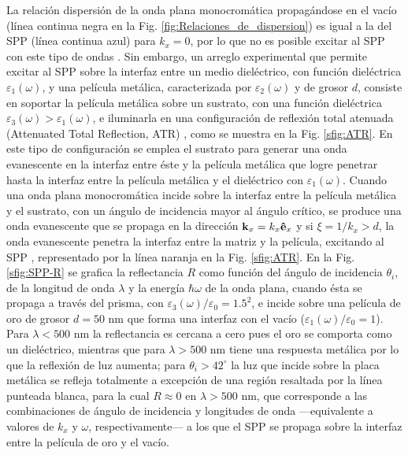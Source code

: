 La relación dispersión de la onda plana monocromática propagándose en el vacío (línea continua negra en la Fig. \ref{fig:Relaciones_de_dispersion})  es igual a la del SPP (línea continua azul) para  $k_x=0$, por lo que no es posible excitar al SPP con este tipo de ondas \cite{trugler2011properties}. Sin embargo, un arreglo experimental que permite excitar al SPP sobre la interfaz entre un medio dieléctrico, con función dieléctrica $\varepsilon_1(\omega)$, y una película  metálica, caracterizada por $\varepsilon_2(\omega)$ y de grosor $d$, consiste en soportar la película metálica sobre un sustrato, con una función dieléctrica $\varepsilon_3(\omega)>\varepsilon_1(\omega)$, e iluminarla en una configuración de reflexión total atenuada (Attenuated Total Reflection, ATR) \cite{kabashin2009plasmonic,trugler2011properties}, como se muestra en la Fig. \ref{sfig:ATR}. En este tipo de configuración se emplea el sustrato para generar una onda evanescente en la interfaz entre éste y la película metálica que logre penetrar hasta la interfaz entre la película metálica y el dieléctrico con $\varepsilon_1(\omega)$. Cuando una onda plana monocromática incide sobre la interfaz entre la película metálica y el sustrato, con un ángulo de incidencia mayor al ángulo crítico, se produce una onda evanescente que se propaga en la dirección $\vb{k}_x=k_x\vu{e}_x$ y si $\xi=1/k_x>d$, la onda evanescente penetra la interfaz entre la matriz y la película, excitando al SPP \cite{trugler2011properties}, representado por la línea naranja en la Fig. \ref{sfig:ATR}. En la Fig. \ref{sfig:SPP-R} se grafica la reflectancia $R$ como función del ángulo de incidencia $\theta_i$, de la longitud de onda $\lambda$ y la energía $\hbar\omega$ de la onda plana, cuando ésta se propaga a través del prisma, con $\varepsilon_3(\omega)/\varepsilon_0 = 1.5^2$, e incide sobre una película de oro de grosor $d=50$ nm que forma una interfaz con el vacío ($\varepsilon_1(\omega)/\varepsilon_0 = 1$). Para $\lambda<500$ nm la reflectancia es cercana a cero pues el oro se comporta como un dieléctrico, mientras que para $\lambda>500$ nm tiene una respuesta metálica por lo que la reflexión de luz aumenta; para $\theta_i>42^\circ$ la luz que incide sobre la placa metálica se refleja totalmente a excepción de una región resaltada por la línea punteada blanca, para la cual $R\approx 0$ en $\lambda>500$ nm, que  corresponde a las combinaciones de ángulo de incidencia y longitudes de onda ---equivalente a valores de $k_x$ y $\omega$, respectivamente--- a los que el SPP se propaga sobre la interfaz entre la película de oro y el vacío.
			
